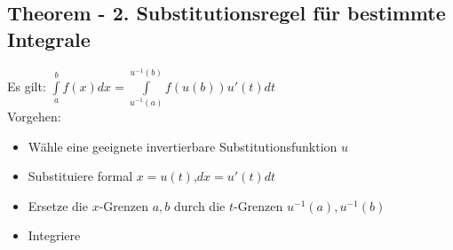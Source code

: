 \documentclass[../main.tex]{subfiles}
\begin{document}
\subsection{Theorem - 2. Substitutionsregel für bestimmte Integrale}
Es gilt: $ \int\limits_a^b f(x)dx = \int\limits_{u^{-1}(a)}^{u^{-1}(b)} f(u(b))u'(t)dt$ \\
Vorgehen: \\
\begin{itemize}
    \item Wähle eine geeignete invertierbare Substitutionsfunktion $u$
    \item Substituiere formal $x=u(t)$,$dx=u'(t)dt$
    \item Ersetze die $x$-Grenzen $a,b$ durch die $t$-Grenzen $u^{-1}(a),u^{-1}(b)$
    \item Integriere
\end{itemize}
\end{document}
